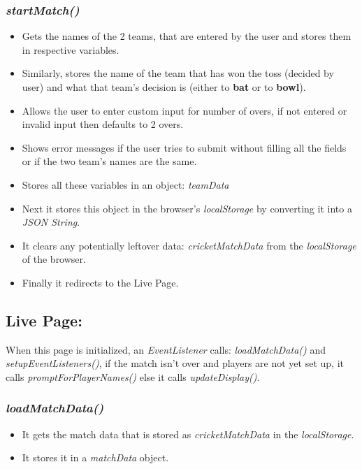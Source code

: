 \documentclass[a4paper,12pt]{article}
\begin{document}
\subsubsection{\textit{startMatch()}}
\begin{itemize}
\item Gets the names of the 2 teams, that are entered by the user and stores them in respective variables.
\item Similarly, stores the name of the team that has won the toss (decided by user) and what that team's decision is (either to \textbf{bat} or to \textbf{bowl}).
\item Allows the user to enter custom input for number of overs, if not entered or invalid input then defaults to 2 overs.
\item Shows error messages if the user tries to submit without filling all the fields or if the two team's names are the same.
\item Stores all these variables in an object: \textit{teamData}
\item Next it stores this object in the browser's \textit{localStorage} by converting it into a \textit{JSON String}.
\item It clears any potentially leftover data: \textit{cricketMatchData} from the \textit{localStorage} of the browser.
\item Finally it redirects to the Live Page.
\end{itemize}

\subsection{Live Page:}
\label{basic2}
When this page is initialized, an \textit{EventListener} calls: \textit{loadMatchData()} and \textit{setupEventListeners()}, 
if the match isn't over and players are not yet set up, it calls \textit{promptForPlayerNames()} else it calls \textit{updateDisplay()}.
\subsubsection{\textit{loadMatchData()}}
\begin{itemize}
\item It gets the match data that is stored as \textit{cricketMatchData} in the \textit{localStorage}.
\item It stores it in a \textit{matchData} object. 
\end{itemize}
\end{document}
